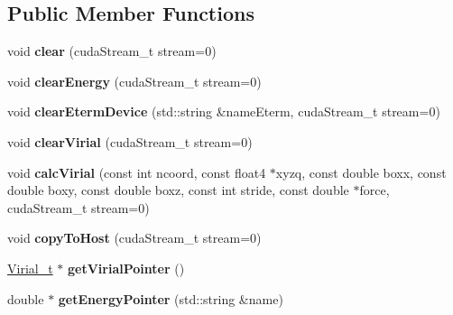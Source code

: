 \subsection*{Public Member Functions}
\begin{DoxyCompactItemize}
\item 
\hypertarget{classCudaEnergyVirial_abd7c7541d63e6070b090d911cfb27eb0}{}\label{classCudaEnergyVirial_abd7c7541d63e6070b090d911cfb27eb0} 
void {\bfseries clear} (cuda\+Stream\+\_\+t stream=0)
\item 
\hypertarget{classCudaEnergyVirial_a16fb1cc80eb715665e18f0d68dd27f79}{}\label{classCudaEnergyVirial_a16fb1cc80eb715665e18f0d68dd27f79} 
void {\bfseries clear\+Energy} (cuda\+Stream\+\_\+t stream=0)
\item 
\hypertarget{classCudaEnergyVirial_aa25dbdc2b516c3edad08972c0aed6c62}{}\label{classCudaEnergyVirial_aa25dbdc2b516c3edad08972c0aed6c62} 
void {\bfseries clear\+Eterm\+Device} (std\+::string \&name\+Eterm, cuda\+Stream\+\_\+t stream=0)
\item 
\hypertarget{classCudaEnergyVirial_adaaf288d88c47f0fa9edb344dec51a6f}{}\label{classCudaEnergyVirial_adaaf288d88c47f0fa9edb344dec51a6f} 
void {\bfseries clear\+Virial} (cuda\+Stream\+\_\+t stream=0)
\item 
\hypertarget{classCudaEnergyVirial_a0b480c2fcd79d10e60e78630ccda151c}{}\label{classCudaEnergyVirial_a0b480c2fcd79d10e60e78630ccda151c} 
void {\bfseries calc\+Virial} (const int ncoord, const float4 $\ast$xyzq, const double boxx, const double boxy, const double boxz, const int stride, const double $\ast$force, cuda\+Stream\+\_\+t stream=0)
\item 
\hypertarget{classCudaEnergyVirial_aec2ddf4b9c9b48d293076292fc673243}{}\label{classCudaEnergyVirial_aec2ddf4b9c9b48d293076292fc673243} 
void {\bfseries copy\+To\+Host} (cuda\+Stream\+\_\+t stream=0)
\item 
\hypertarget{classCudaEnergyVirial_ab269fa6df3d5ad84463614447b32748f}{}\label{classCudaEnergyVirial_ab269fa6df3d5ad84463614447b32748f} 
\hyperlink{structVirial__t}{Virial\+\_\+t} $\ast$ {\bfseries get\+Virial\+Pointer} ()
\item 
\hypertarget{classCudaEnergyVirial_aed8dcbf3e902dc8562c829798406c568}{}\label{classCudaEnergyVirial_aed8dcbf3e902dc8562c829798406c568} 
double $\ast$ {\bfseries get\+Energy\+Pointer} (std\+::string \&name)
\item 
\hypertarget{classCudaEnergyVirial_aa0c31fb5443de9daae00b05a5f7a73d5}{}\label{classCudaEnergyVirial_aa0c31fb5443de9daae00b05a5f7a73d5} 

\end{DoxyCompactItemize}
